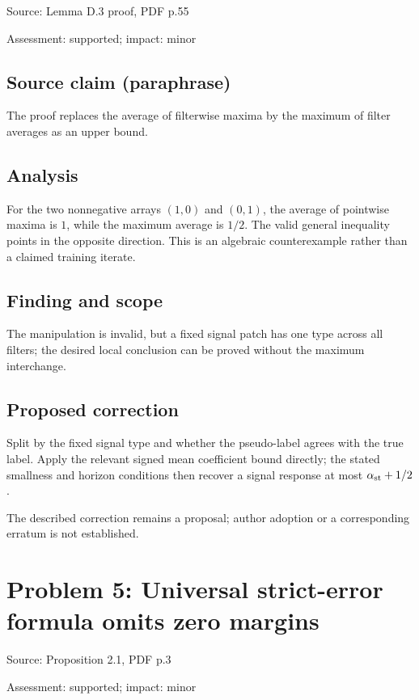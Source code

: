 \documentclass[11pt]{article}
\begin{document}
Source: Lemma D.3 proof, PDF p.55

Assessment: supported; impact: minor

\subsection*{Source claim (paraphrase)}

The proof replaces the average of filterwise maxima by the maximum of filter averages as an upper bound.

\subsection*{Analysis}

For the two nonnegative arrays \((1,0)\) and \((0,1)\), the average of pointwise maxima is \(1\), while the maximum average is \(1/2\). The valid general inequality points in the opposite direction. This is an algebraic counterexample rather than a claimed training iterate.

\subsection*{Finding and scope}

The manipulation is invalid, but a fixed signal patch has one type across all filters; the desired local conclusion can be proved without the maximum interchange.

\subsection*{Proposed correction}

Split by the fixed signal type and whether the pseudo-label agrees with the true label. Apply the relevant signed mean coefficient bound directly; the stated smallness and horizon conditions then recover a signal response at most \(\alpha_{\rm st}+1/2\).

The described correction remains a proposal; author adoption or a corresponding erratum is not established.

\section*{Problem 5: Universal strict-error formula omits zero margins}

Source: Proposition 2.1, PDF p.3

Assessment: supported; impact: minor
\end{document}
